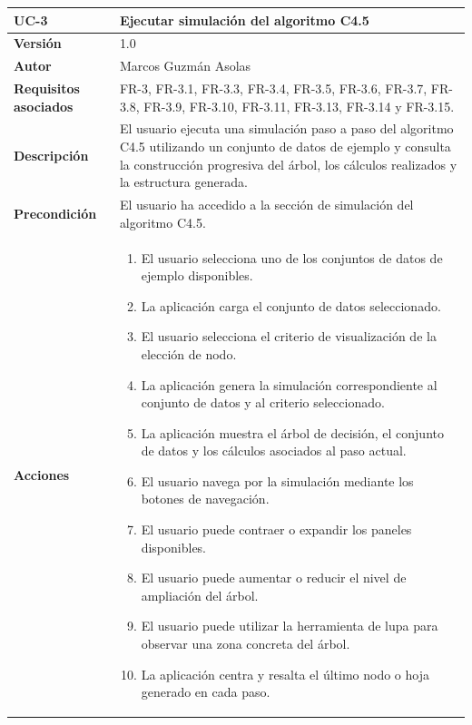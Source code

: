 \begin{table}[p]
    \centering
    \begin{tabularx}{\linewidth}{p{} p{}}
        \toprule
        \textbf{UC-3} & \textbf{Ejecutar simulación del algoritmo C4.5} \\
        \toprule
        \textbf{Versión} & 1.0 \\
        \textbf{Autor} & Marcos Guzmán Asolas \\
        \textbf{Requisitos asociados} & FR-3, FR-3.1, FR-3.3, FR-3.4, FR-3.5, FR-3.6, FR-3.7, FR-3.8, FR-3.9, FR-3.10, FR-3.11, FR-3.13, FR-3.14 y FR-3.15. \\
        \textbf{Descripción} & El usuario ejecuta una simulación paso a paso del algoritmo C4.5 utilizando un conjunto de datos de ejemplo y consulta la construcción progresiva del árbol, los cálculos realizados y la estructura generada. \\
        \textbf{Precondición} & El usuario ha accedido a la sección de simulación del algoritmo C4.5. \\
        \textbf{Acciones} &
        \begin{enumerate}
            \def\labelenumi{\arabic{enumi}.}
            \tightlist
            \item El usuario selecciona uno de los conjuntos de datos de ejemplo disponibles.
            \item La aplicación carga el conjunto de datos seleccionado.
            \item El usuario selecciona el criterio de visualización de la elección de nodo.
            \item La aplicación genera la simulación correspondiente al conjunto de datos y al criterio seleccionado.
            \item La aplicación muestra el árbol de decisión, el conjunto de datos y los cálculos asociados al paso actual.
            \item El usuario navega por la simulación mediante los botones de navegación.
            \item El usuario puede contraer o expandir los paneles disponibles.
            \item El usuario puede aumentar o reducir el nivel de ampliación del árbol.
            \item El usuario puede utilizar la herramienta de lupa para observar una zona concreta del árbol.
            \item La aplicación centra y resalta el último nodo o hoja generado en cada paso.

\end{enumerate}
\end{tabularx}
\end{table}
